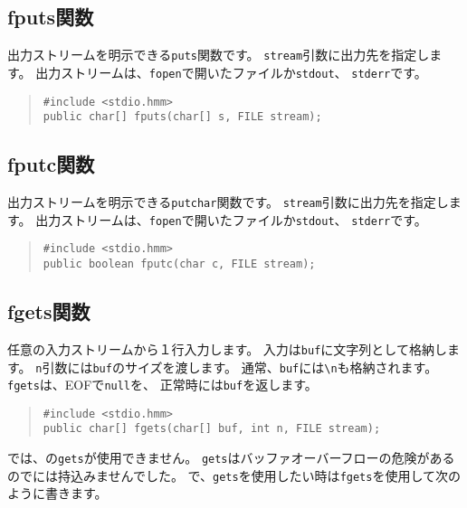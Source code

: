\subsection{fputs関数}

出力ストリームを明示できる\verb/puts/関数です。
\verb/stream/引数に出力先を指定します。
出力ストリームは、\verb/fopen/で開いたファイルか\verb/stdout/、
\verb/stderr/です。

\begin{quote}
\begin{verbatim}
#include <stdio.hmm>
public char[] fputs(char[] s, FILE stream);
\end{verbatim}
\end{quote}

\subsection{fputc関数}

出力ストリームを明示できる\verb/putchar/関数です。
\verb/stream/引数に出力先を指定します。
出力ストリームは、\verb/fopen/で開いたファイルか\verb/stdout/、
\verb/stderr/です。

\begin{quote}
\begin{verbatim}
#include <stdio.hmm>
public boolean fputc(char c, FILE stream);
\end{verbatim}
\end{quote}

\subsection{fgets関数}

任意の入力ストリームから１行入力します。
入力は\verb/buf/に文字列として格納します。
\verb/n/引数には\verb/buf/のサイズを渡します。
通常、\verb/buf/には\verb/\n/も格納されます。
\verb/fgets/は、EOFで\verb/null/を、
正常時には\verb/buf/を返します。

\begin{quote}
\begin{verbatim}
#include <stdio.hmm>
public char[] fgets(char[] buf, int n, FILE stream);
\end{verbatim}
\end{quote}

\cmm では、\cl の\verb/gets/が使用できません。
\verb/gets/はバッファオーバーフローの危険があるので\cmm には持込みませんでした。
\cmm で、\verb/gets/を使用したい時は\verb/fgets/を使用して次のように書きます。

